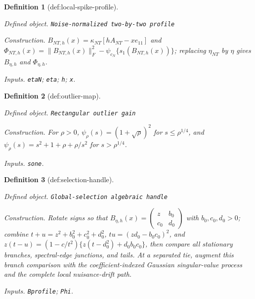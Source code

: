 \documentclass{article}
\newtheorem{definition}{Definition}
\begin{document}
\begin{definition}[def:local-spike-profile]\label{def:local-spike-profile}
\par\smallskip\noindent\emph{Defined object.} \texttt{Noise-\allowbreak{}normalized two-\allowbreak{}by-\allowbreak{}two profile}
\par\smallskip\noindent\emph{Construction.} \(B_{NT,h}(x)=\kappa_{NT}\left[hA_{NT}-xe_{11}\right]\) and \(\Phi_{NT,h}(x)=\|B_{NT,h}(x)\|_F^2-\psi_{c_N}\{s_1(B_{NT,h}(x))\}\); replacing \(\eta_{NT}\) by \(\eta\) gives \(B_{\eta,h}\) and \(\Phi_{\eta,h}\).
\par\smallskip\noindent\emph{Inputs.} \texttt{etaN}; \texttt{eta}; \texttt{h}; \texttt{x}.
\end{definition}

\begin{definition}[def:outlier-map]\label{def:outlier-map}
\par\smallskip\noindent\emph{Defined object.} \texttt{Rectangular outlier gain}
\par\smallskip\noindent\emph{Construction.} For \(\rho>0\), \(\psi_{\rho}(s)=(1+\sqrt\rho)^2\) for \(s\le\rho^{1/4}\), and \(\psi_{\rho}(s)=s^2+1+\rho+\rho/s^2\) for \(s>\rho^{1/4}\).
\par\smallskip\noindent\emph{Inputs.} \texttt{sone}.
\end{definition}

\begin{definition}[def:selection-handle]\label{def:selection-handle}
\par\smallskip\noindent\emph{Defined object.} \texttt{Global-\allowbreak{}selection algebraic handle}
\par\smallskip\noindent\emph{Construction.} Rotate signs so that \(B_{\eta,h}(x)=\begin{pmatrix}z&b_0\\c_0&d_0\end{pmatrix}\) with \(b_0,c_0,d_0>0\); combine \(t+u=z^2+b_0^2+c_0^2+d_0^2\), \(tu=(zd_0-b_0c_0)^2\), and \(z(t-u)=(1-c/t^2)\{z(t-d_0^2)+d_0b_0c_0\}\), then compare all stationary branches, spectral-edge junctions, and tails. At a separated tie, augment this branch comparison with the coefficient-indexed Gaussian singular-value process and the complete local nuisance-drift path.
\par\smallskip\noindent\emph{Inputs.} \texttt{Bprofile}; \texttt{Phi}.
\end{definition}
\end{document}
